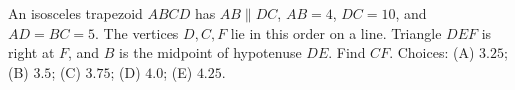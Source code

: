 An isosceles trapezoid $ABCD$ has $AB\parallel DC$, $AB=4$, $DC=10$, and $AD=BC=5$. The vertices $D,C,F$ lie in this order on a line. Triangle $DEF$ is right at $F$, and $B$ is the midpoint of hypotenuse $DE$. Find $CF$. Choices: (A) $3.25$; (B) $3.5$; (C) $3.75$; (D) $4.0$; (E) $4.25$.
